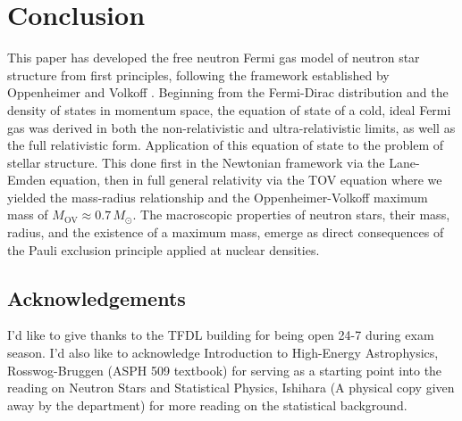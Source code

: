 \section{Conclusion}
\label{sec:conclusion}
 
This paper has developed the free neutron Fermi gas model of neutron star
structure from first principles, following the framework established by
Oppenheimer and Volkoff \cite{Oppy}. Beginning from the
Fermi-Dirac distribution and the density of states in momentum space,
the equation of state of a cold, ideal Fermi gas was derived in both the
non-relativistic and ultra-relativistic limits, as well as the full
relativistic form. Application of this
equation of state to the problem of stellar structure. This done first in the
Newtonian framework via the Lane-Emden equation, then in full general
relativity via the TOV equation where we yielded the mass-radius relationship
and the Oppenheimer-Volkoff maximum mass of $M_{\mathrm{OV}} \approx
0.7\,M_\odot$. The macroscopic properties of neutron stars, their
mass, radius, and the existence of a maximum mass, emerge as direct
consequences of the Pauli exclusion principle applied at nuclear
densities.

\subsection{Acknowledgements}
I'd like to give thanks to the TFDL building for being open 24-7 during exam season. I'd also like to acknowledge Introduction to High-Energy Astrophysics, Rosswog-Bruggen\cite{rosswog_bruggen_2007} (ASPH 509 textbook) for serving as a starting point into the reading on Neutron Stars and Statistical Physics, Ishihara\cite{isihara_1971} (A physical copy given away by the department) for more reading on the statistical background.
